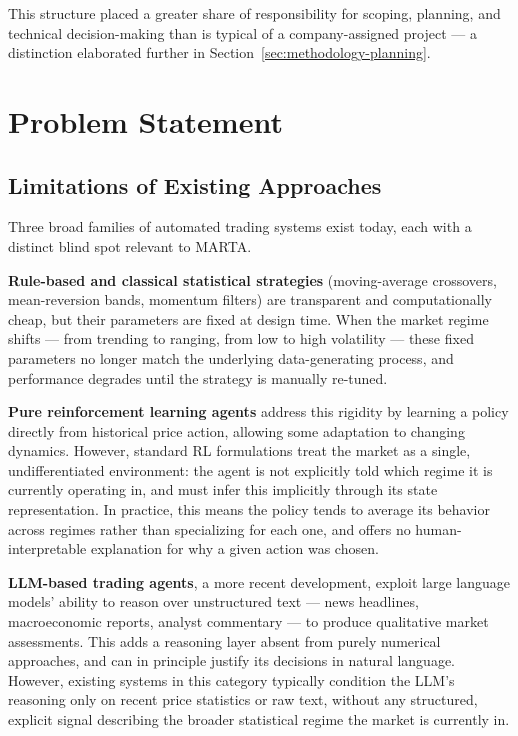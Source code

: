 This structure placed a greater share of responsibility for scoping, planning, and technical decision-making than is typical of a company-assigned project --- a distinction elaborated further in Section~\ref{sec:methodology-planning}.

\section{Problem Statement}
\label{sec:problem-statement}

\subsection{Limitations of Existing Approaches}
\label{subsec:limitations-existing}

Three broad families of automated trading systems exist today, each with a distinct blind spot relevant to MARTA.

\textbf{Rule-based and classical statistical strategies} (moving-average crossovers, mean-reversion bands, momentum filters) are transparent and computationally cheap, but their parameters are fixed at design time. When the market regime shifts --- from trending to ranging, from low to high volatility --- these fixed parameters no longer match the underlying data-generating process, and performance degrades until the strategy is manually re-tuned.

\textbf{Pure reinforcement learning agents} address this rigidity by learning a policy directly from historical price action, allowing some adaptation to changing dynamics. However, standard RL formulations treat the market as a single, undifferentiated environment: the agent is not explicitly told which regime it is currently operating in, and must infer this implicitly through its state representation. In practice, this means the policy tends to average its behavior across regimes rather than specializing for each one, and offers no human-interpretable explanation for why a given action was chosen.

\textbf{LLM-based trading agents}, a more recent development, exploit large language models' ability to reason over unstructured text --- news headlines, macroeconomic reports, analyst commentary --- to produce qualitative market assessments. This adds a reasoning layer absent from purely numerical approaches, and can in principle justify its decisions in natural language. However, existing systems in this category typically condition the LLM's reasoning only on recent price statistics or raw text, without any structured, explicit signal describing the broader statistical regime the market is currently in.


